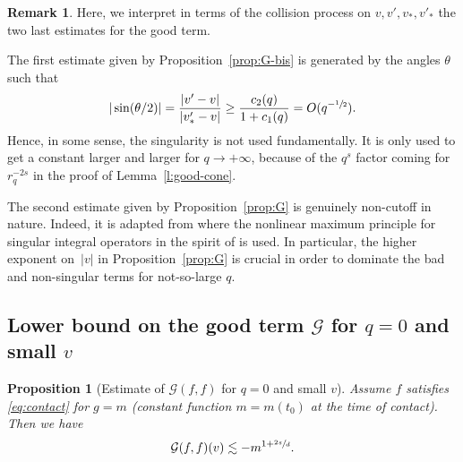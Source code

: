 \documentclass[11pt]{article}
\newcommand{\Subsection}{\subsection}
\theoremstyle{plain}
\newtheorem{prop}[thm]{Proposition}
\theoremstyle{definition}
\newtheorem{remark}[thm]{Remark}
\numberwithin{equation}{section}
\begin{document}
\begin{remark} Here, we interpret in terms of the collision process on
$v,v',v_*,v'_*$ the two last estimates for the good term.

The first estimate given by Proposition~\ref{prop:G-bis} is
generated by the angles $\theta$ such that
\[
|\sin (\theta/2)| = \frac{|v'-v|}{|v'_*-v|} \ge
\frac{c_2(q)}{1+c_1(q)} = O(q^{-\sfrac12}).
\]
Hence, in some sense, the singularity is not used fundamentally. It
is only used to get a constant larger and larger for
$q \to + \infty$, because of the $q^s$ factor coming for $r_q^{-2s}$
in the proof of Lemma~\ref{l:good-cone}.

The second estimate given by Proposition~\ref{prop:G} is genuinely
non-cutoff in nature. Indeed, it is adapted from \cite{luis} where
the nonlinear maximum principle for singular integral operators in
the spirit of \cite{constantinvicol} is used. In particular, the
higher exponent on~$|v|$ in Proposition~\ref{prop:G} is crucial in
order to dominate the bad and non-singular terms for not-so-large
$q$.
\end{remark}

\Subsection{Lower bound on the good term $\mathcal{G}$ for $q=0$ and
small $v$}

\begin{prop}[Estimate of {$\mathcal{G} (f,f)$} for $q=0$ and small
$v$] \label{prop:Gsmallv} Assume $f$ satisfies \eqref{eq:contact}
for $g = m$ (constant function $m=m(t_0)$ at the time of contact).
Then we have
\[
\mathcal{G} (f,f)(v) \lesssim - m^{1+\sfrac{2s}d}.
\]
\end{prop}
\end{document}
